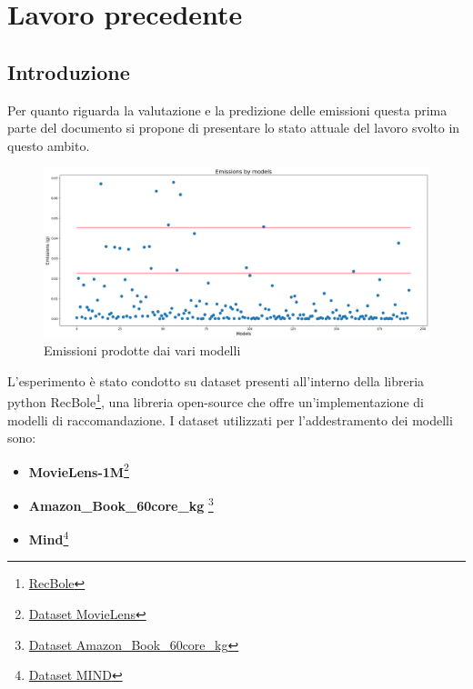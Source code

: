 \section{Lavoro precedente}


\subsection{Introduzione}

\noindent Per quanto riguarda la valutazione e la predizione delle emissioni questa prima parte del documento si propone di presentare lo stato attuale del lavoro svolto in questo ambito.





\begin{figure}[H]
    \centering
    \includegraphics[width=\textwidth]{images/situazione-attuale.png}
    \caption{Emissioni prodotte dai vari modelli}
\end{figure}

\noindent L'esperimento è stato condotto su dataset presenti all'interno della libreria python RecBole\footnote{\href{http://recbole.io}{RecBole}}{}, una libreria open-source che offre un'implementazione di modelli di raccomandazione. I dataset utilizzati per l'addestramento dei modelli sono:
\begin{itemize}
    \item \textbf{MovieLens-1M}\footnote{\href{https://github.com/RUCAIBox/RecSysDatasets/blob/master/conversion_tools/usage/MovieLens.md}{Dataset MovieLens}}{}
    \item \textbf{Amazon\_Book\_60core\_kg} \footnote{\href{https://github.com/RUCAIBox/RecSysDatasets/blob/master/conversion_tools/usage/Amazon-book-KG.md}{Dataset Amazon\_Book\_60core\_kg}}{}
    \item \textbf{Mind}\footnote{\href{https://github.com/RUCAIBox/RecSysDatasets/blob/master/conversion_tools/usage/MIND.md}{Dataset MIND}}{}
\end{itemize}



